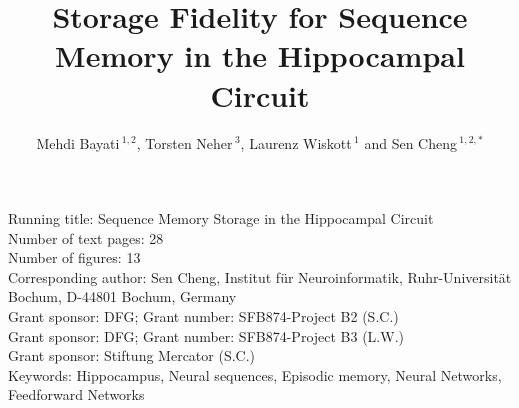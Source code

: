 \documentclass[utf8]{frontiersSCNS} %
\def\firstAuthorLast{} %
\def\Authors{Mehdi Bayati\,$^{1,2}$, Torsten Neher\,$^{3}$, Laurenz Wiskott\,$^{1}$ and Sen Cheng\,$^{1,2,*}$}
\begin{document}
\onecolumn
{}

\title{Storage Fidelity for Sequence Memory in the Hippocampal Circuit} 

\author[\firstAuthorLast ]{\Authors} %
\address{} %
\correspondance{} %

\extraAuth{}%


\maketitle


Running title: Sequence Memory Storage in the Hippocampal Circuit\\
Number of text pages: 28\\
Number of figures: 13\\
Corresponding author: Sen Cheng, Institut f\"ur Neuroinformatik, Ruhr-Universit\"at Bochum, D-44801 Bochum, Germany\\
Grant sponsor: DFG; Grant number: SFB874-Project B2 (S.C.)\\
Grant sponsor: DFG; Grant number: SFB874-Project B3 (L.W.)\\
Grant sponsor: Stiftung Mercator (S.C.)\\
Keywords: Hippocampus, Neural sequences, Episodic memory, Neural Networks, Feedforward Networks\\

\newpage

\linenumbers
\end{document}
